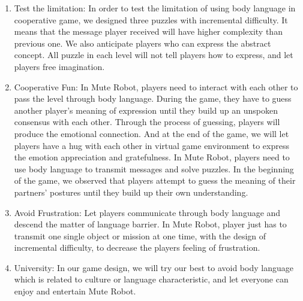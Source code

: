 \documentclass{sigchi}
\begin{document}
\begin{enumerate}
\item Test the limitation: In order to test the limitation of using body language in cooperative game, we designed three puzzles with incremental difficulty. It means that the message player received will have higher complexity than previous one.
We also anticipate players who can express the abstract concept. All puzzle in each level will not tell players how to express, and let players free imagination.
\item Cooperative Fun: 
In Mute Robot, players need to interact with each other to pass the level through body language. During the game, they have to guess another player's meaning of expression until they build up an unspoken consensus with each other. Through the process of guessing, players will produce the emotional connection. And at the end of the game, we will let players have a hug with each other in virtual game environment to express the emotion appreciation and gratefulness.
In Mute Robot, players need to use body language to transmit messages and solve puzzles. In the beginning of the game, we observed that players attempt to guess the meaning of their partners’ postures until they build up their own understanding. 
\item Avoid Frustration: 
Let players communicate through body language and descend the matter of language barrier. In Mute Robot, player just has to transmit one single object or mission at one time, with the design of incremental difficulty, to decrease the players feeling of frustration.
\item University: 
In our game design, we will try our best to avoid body language which is related to culture or language characteristic, and let everyone can enjoy and entertain Mute Robot.
\end{enumerate}
\end{document}
